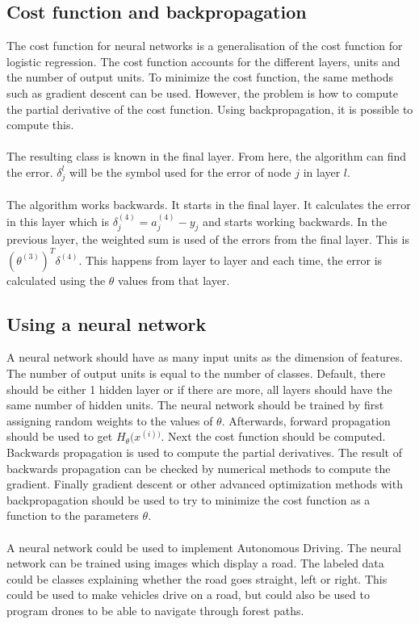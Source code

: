\subsection{Cost function and backpropagation}
The cost function for neural networks is a generalisation of the cost function for logistic regression. The cost function accounts for the different layers, units and the number of output units. To minimize the cost function, the same methods such as gradient descent can be used. However, the problem is how to compute the partial derivative of the cost function. Using backpropagation, it is possible to compute this. \cite{neuralnetCost} \\\\
The resulting class is known in the final layer. From here, the algorithm can find the error. $\delta_j^l$ will be the symbol used for the error of node $j$ in layer $l$. \\
\\
The algorithm works backwards. It starts in the final layer. It calculates the error in this layer which is $\delta_j^{(4)} = a_j^{(4)} - y_j$ and starts working backwards. In the previous layer, the weighted sum is used of the errors from the final layer. This is $(\theta^{(3)})^T\delta^{(4)}$. This happens from layer to layer and each time, the error is calculated using the $\theta$ values from that layer.
\subsection{Using a neural network}
A neural network should have as many input units as the dimension of features. The number of output units is equal to the number of classes. Default, there should be either 1 hidden layer or if there are more, all layers should have the same number of hidden units. \cite{neuralnettraining} The neural network should be trained by first assigning random weights to the values of $\theta$. Afterwards, forward propagation should be used to get $H_\theta(x^{(i))}$. Next the cost function should be computed. Backwards propagation is used to compute the partial derivatives. The result of backwards propagation can be checked by numerical methods to compute the gradient. Finally gradient descent or other advanced optimization methods with backpropagation should be used to try to minimize the cost function as a function to the parameters $\theta$.  \\\\
A neural network could be used to implement Autonomous Driving. The neural network can be trained using images which display a road.  \cite{neuralnetDriving} The labeled data could be classes explaining whether the road goes straight,  left or right. This could be used to make vehicles drive on a road, but could also be used to program drones to be able to navigate through forest paths.  \cite{neuralnetDrone}

